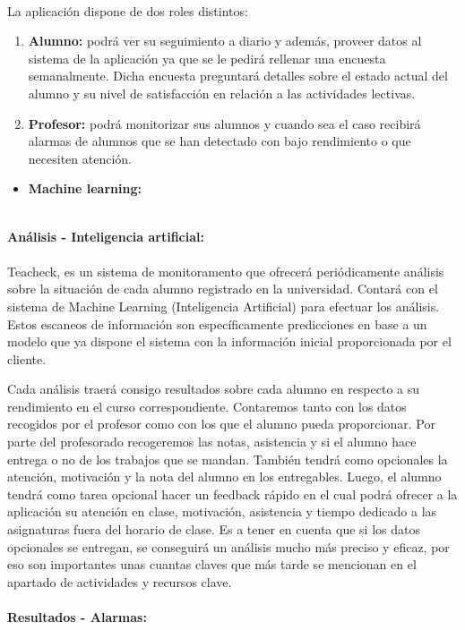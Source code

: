 \paragraph{}
La aplicación dispone de dos roles distintos:
\begin{enumerate}
\item\textbf{Alumno: }podrá ver su seguimiento a diario y además, proveer datos al sistema de la aplicación ya que se le pedirá rellenar una encuesta semanalmente. Dicha encuesta preguntará detalles sobre el estado actual del alumno y su nivel de satisfacción en relación a las actividades lectivas.
\item\textbf{Profesor: }podrá monitorizar sus alumnos y cuando sea el caso recibirá alarmas de alumnos que se han detectado con bajo rendimiento o que necesiten atención.
\end{enumerate}

\begin{itemize}
\item{\textbf{Machine learning: }}
\end{itemize}
\\
\textbf{Análisis - Inteligencia artificial:}
\paragraph{}
Teacheck, es un sistema de monitoramento que ofrecerá periódicamente análisis sobre la situación de cada alumno registrado en la universidad. Contará con el sistema de Machine Learning (Inteligencia Artificial)  para efectuar los análisis. Estos escaneos de información son específicamente predicciones en base a un modelo que ya dispone el sistema con la información inicial proporcionada por el cliente.

Cada análisis traerá consigo resultados sobre cada alumno en respecto a su rendimiento en el curso correspondiente. Contaremos tanto con los datos recogidos por el profesor como con los que el alumno pueda proporcionar. Por parte del profesorado recogeremos las notas, asistencia y si el alumno hace entrega o no de los trabajos que se mandan. También tendrá como opcionales la atención, motivación y la nota del alumno en los entregables. Luego, el alumno tendrá como tarea opcional hacer un feedback rápido en el cual podrá ofrecer a la aplicación su atención en clase, motivación, asistencia y tiempo dedicado a las asignaturas fuera del horario de clase. Es a tener en cuenta que si los datos opcionales se entregan, se conseguirá un análisis mucho más preciso y eficaz, por eso son importantes unas cuantas claves que más tarde se mencionan en el apartado de actividades y recursos clave.\\
\\
\textbf{Resultados - Alarmas:}
